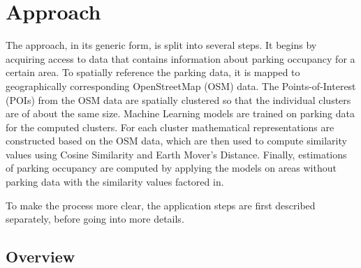 \documentclass{ws-ijait}
\begin{document}
	\section{Approach}
	The approach, in its generic form, is split into several steps. It begins by acquiring access to data that contains information about parking occupancy for a certain area. To spatially reference the parking data, it is mapped to geographically corresponding OpenStreetMap (OSM) data. The Points-of-Interest (POIs) from the OSM data are spatially clustered so that the individual clusters are of about the same size. Machine Learning models are trained on parking data for the computed clusters. For each cluster mathematical representations are constructed based on the OSM data, which are then used to compute similarity values using Cosine Similarity and Earth Mover's Distance. Finally, estimations of parking occupancy are computed by applying the models on areas without parking data with the similarity values factored in.   
	
	To make the process more clear, the application steps are first described separately, before going into more details.  
	
	\subsection{Overview}	
\end{document}

